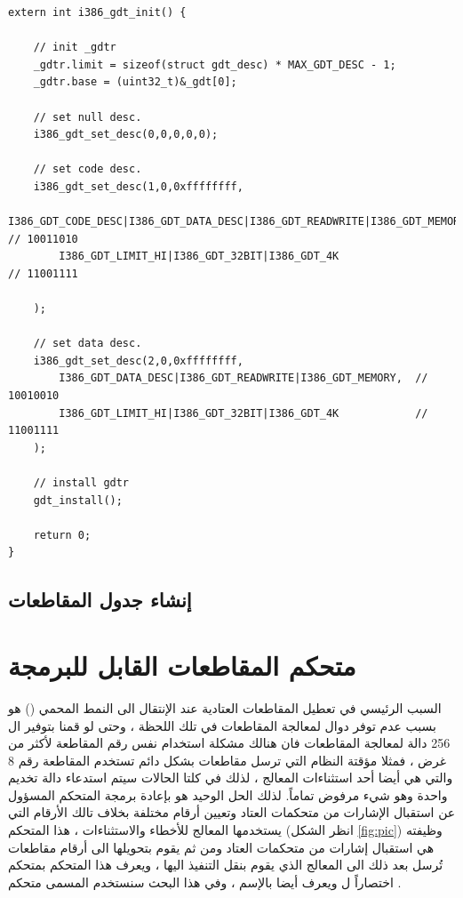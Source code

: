 \documentclass[document.tex]{subfiles}
\begin{document}
\begin{english}
\begin{lstlisting}[label=gdt_c,caption=\en{hal/gdt.cpp:Install GDT}]
extern int i386_gdt_init() {
	
	// init _gdtr
	_gdtr.limit = sizeof(struct gdt_desc) * MAX_GDT_DESC - 1;
	_gdtr.base = (uint32_t)&_gdt[0];
	
	// set null desc.
	i386_gdt_set_desc(0,0,0,0,0);
	
	// set code desc.
	i386_gdt_set_desc(1,0,0xffffffff,
		I386_GDT_CODE_DESC|I386_GDT_DATA_DESC|I386_GDT_READWRITE|I386_GDT_MEMORY, 	// 10011010
		I386_GDT_LIMIT_HI|I386_GDT_32BIT|I386_GDT_4K 								// 11001111
 
	);
	
	// set data desc.
	i386_gdt_set_desc(2,0,0xffffffff,
		I386_GDT_DATA_DESC|I386_GDT_READWRITE|I386_GDT_MEMORY, 	// 10010010
		I386_GDT_LIMIT_HI|I386_GDT_32BIT|I386_GDT_4K			// 11001111
	);
	
	// install gdtr
	gdt_install();
	
	return 0;
}

\end{lstlisting}
\end{english}

\subsection{إنشاء جدول المقاطعات }

\section{متحكم المقاطعات القابل للبرمجة }
السبب الرئيسي في تعطيل المقاطعات العتادية عند الإنتقال الى النمط المحمي () هو بسبب عدم توفر دوال لمعالجة المقاطعات في تلك اللحظة ، وحتى لو قمنا بتوفير ال 256 دالة لمعالجة المقاطعات فان هنالك مشكلة استخدام نفس رقم المقاطعة لأكثر من غرض ، فمثلا مؤقتة النظام  التي ترسل مقاطعات بشكل دائم تستخدم المقاطعة رقم 8 والتي هي أيضا أحد استثناءات المعالج ، لذلك في كلتا الحالات سيتم استدعاء دالة تخديم واحدة وهو شيء مرفوض تماماً. لذلك الحل الوحيد هو بإعادة برمجة المتحكم المسؤول عن استقبال الإشارات من متحكمات العتاد  وتعيين أرقام مختلفة بخلاف تالك الأرقام التي يستخدمها المعالج للأخطاء والاستثناءات ، هذا المتحكم (انظر الشكل \ref{fig:pic}) وظيفته هي استقبال إشارات من متحكمات العتاد ومن ثم يقوم بتحويلها الى أرقام مقاطعات تُرسل بعد ذلك الى المعالج الذي يقوم بنقل التنفيذ اليها ، ويعرف هذا المتحكم بمتحكم  اختصاراً ل  ويعرف أيضا بالإسم  ، وفي هذا البحث سنستخدم المسمى متحكم .
\end{document}
